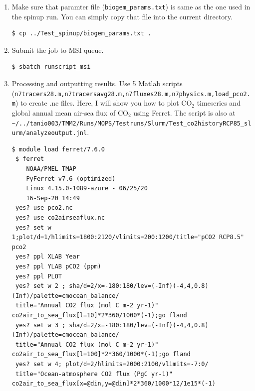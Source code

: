 \documentclass[a4paper]{article}
\begin{document}
\begin{enumerate}
\item Make sure that paramter file (\verb|biogem_params.txt|) is same as the one used in the spinup run. You can simply copy that file into the current directory.
\begin{lstlisting}[style=DOS]
 $ cp ../Test_spinup/biogem_params.txt .
\end{lstlisting}

\item Submit the job to MSI queue.
\begin{lstlisting}[style=DOS]
 $ sbatch runscript_msi
\end{lstlisting}

\item Processing and outputting results. Use 5 Matlab scripts \\ (\verb|n7tracers28.m,n7tracersavg28.m,n7fluxes28.m,n7physics.m,load_pco2.m|) to create .nc files. Here, I will show you how to plot $\mathrm{CO_{2}}$ timeseries and global annual mean air-sea flux of $\mathrm{CO_{2}}$ using Ferret. The script is also at \\ \verb|~/../tanio003/TMM2/Runs/MOPS/Testruns/Slurm/Test_co2historyRCP85_slurm/analyzeoutput.jnl|. 
\begin{lstlisting}[style=DOS]
 $ module load ferret/7.6.0
 $ ferret
  	NOAA/PMEL TMAP
 	PyFerret v7.6 (optimized)
 	Linux 4.15.0-1089-azure - 06/25/20
 	16-Sep-20 14:49
 yes? use pco2.nc
 yes? use co2airseaflux.nc
 yes? set w 1;plot/d=1/hlimits=1800:2120/vlimits=200:1200/title="pCO2 RCP8.5" pco2
 yes? ppl XLAB Year
 yes? ppl YLAB pCO2 (ppm)
 yes? ppl PLOT
 yes? set w 2 ; sha/d=2/x=-180:180/lev=(-Inf)(-4,4,0.8)(Inf)/palette=cmocean_balance/
 title="Annual CO2 flux (mol C m-2 yr-1)" co2air_to_sea_flux[l=10]*2*360/1000*(-1);go fland
 yes? set w 3 ; sha/d=2/x=-180:180/lev=(-Inf)(-4,4,0.8)(Inf)/palette=cmocean_balance/
 title="Annual CO2 flux (mol C m-2 yr-1)" co2air_to_sea_flux[l=100]*2*360/1000*(-1);go fland
 yes? set w 4; plot/d=2/hlimits=2000:2100/vlimits=-7:0/
 title="Ocean-atmosphere CO2 flux (PgC yr-1)" co2air_to_sea_flux[x=@din,y=@din]*2*360/1000*12/1e15*(-1)
\end{lstlisting}


\end{enumerate}
\end{document}
